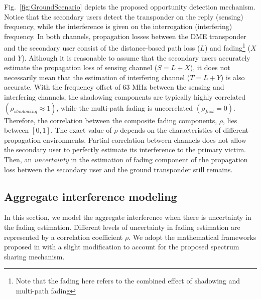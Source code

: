 \documentclass[12pt,submission,journal,onecolumn]{IEEEtran}
\begin{document}
Fig.~\ref{fig:GroundScenario} depicts the proposed opportunity detection mechanism. Notice that the secondary users detect the transponder on the reply (sensing) frequency, while the interference is given on the interrogation (interfering) frequency. In both channels, propagation losses between the DME transponder and the secondary user consist of the distance-based path loss ($L$) and fading\footnote{Note that the fading here refers to the combined effect of shadowing and multi-path fading} ($X$ and $Y$). Although it is reasonable to assume that the secondary users accurately estimate the propagation loss of sensing channel ($S=L+X$), it does not necessarily mean that the estimation of interfering channel ($T=L+Y$) is also accurate. With the frequency offset of 63 MHz between the sensing and interfering channels, the shadowing components are typically highly correlated $(\rho_{shadowing}\approx1)$\cite{188579}, while the multi-path fading is uncorrelated $(\rho_{fast}=0)$. Therefore, the correlation between the composite fading components, $\rho$, lies between $[0,1]$. The exact value of $\rho$ depends on the characteristics of different propagation environments. Partial correlation between channels does not allow the secondary user to perfectly estimate its interference to the primary victim. Then, an \emph{uncertainty} in the estimation of fading component of the propagation loss between the secondary user and the ground transponder still remains. 
\subsection{Aggregate interference modeling}
\label{subsec:interferenceGround}
In this section, we model the aggregate interference when there is uncertainty in the fading estimation. Different levels of uncertainty in fading estimation are represented by a correlation coefficient $\rho$. We adopt the mathematical frameworks proposed in \cite{5936226,gs0801,5701700} with a slight modification to account for the proposed spectrum sharing mechanism.
\end{document}

